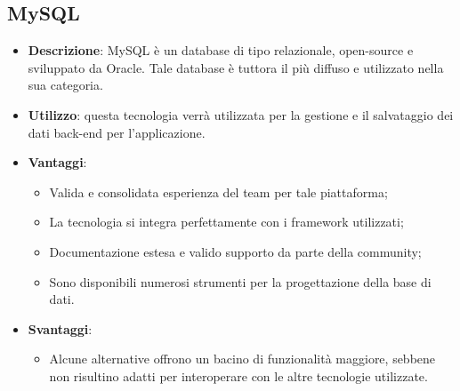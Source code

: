 \subsection{MySQL}
\begin{itemize}
	\item \textbf{Descrizione}: MySQL è un database di tipo relazionale, open-source e sviluppato da Oracle. Tale database è tuttora il più diffuso e utilizzato nella sua categoria.
	\item \textbf{Utilizzo}: questa tecnologia verrà utilizzata per la gestione e il salvataggio dei dati back-end per l'applicazione.
	\item \textbf{Vantaggi}:
	\begin{itemize}
		\item Valida e consolidata esperienza del team per tale piattaforma;
		\item La tecnologia si integra perfettamente con i framework utilizzati;
		\item Documentazione estesa e valido supporto da parte della community;
		\item Sono disponibili numerosi strumenti per la progettazione della base di dati.
	\end{itemize}
	\item \textbf{Svantaggi}:
	\begin{itemize}
		\item Alcune alternative offrono un bacino di funzionalità maggiore, sebbene non risultino adatti per interoperare con le altre tecnologie utilizzate.
	\end{itemize}
\end{itemize}



